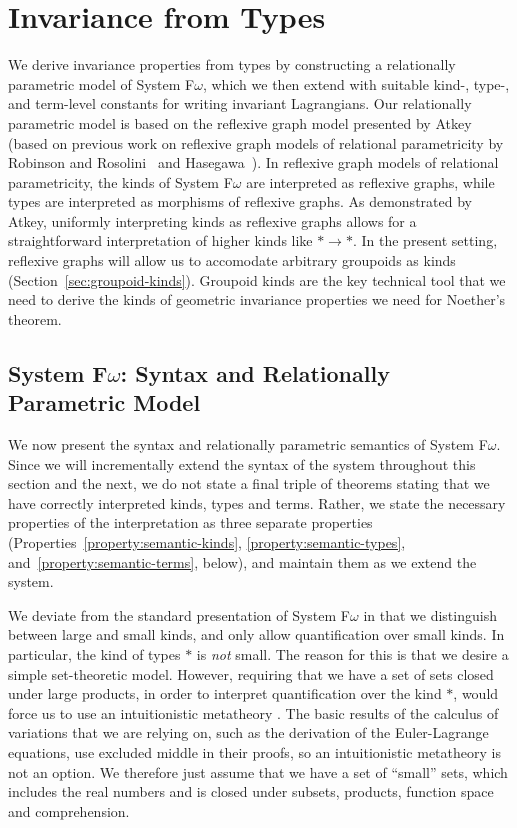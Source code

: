 \documentclass[preprint]{sigplanconf}
\theoremstyle{examplestyle}
\begin{document}
\section{Invariance from Types}
\label{sec:symmetry-from-types}

We derive invariance properties from types by constructing a
relationally parametric model of System F$\omega$, which we then
extend with suitable kind-, type-, and term-level constants for
writing invariant Lagrangians. Our relationally parametric model is
based on the reflexive graph model presented by
Atkey~\cite{atkey12relational} (based on previous work on reflexive
graph models of relational parametricity by Robinson and
Rosolini~\cite{robinson94} and Hasegawa~\cite{hasegawa94}). In
reflexive graph models of relational parametricity, the kinds of
System F$\omega$ are interpreted as reflexive graphs, while types are
interpreted as morphisms of reflexive graphs. As demonstrated by
Atkey, uniformly interpreting kinds as reflexive graphs allows for a
straightforward interpretation of higher kinds like $* \to *$. In the
present setting, reflexive graphs will allow us to accomodate
arbitrary groupoids as kinds
(Section~\ref{sec:groupoid-kinds}). Groupoid kinds are the key
technical tool that we need to derive the kinds of geometric
invariance properties we need for Noether's theorem.

\subsection{System F$\omega$: Syntax and Relationally Parametric Model}
\label{sec:refl-graphs-for-fomega}

We now present the syntax and relationally parametric semantics of
System F$\omega$. Since we will incrementally extend the syntax of the
system throughout this section and the next, we do not state a final
triple of theorems stating that we have correctly interpreted kinds,
types and terms. Rather, we state the necessary properties of the
interpretation as three separate properties
(Properties~\ref{property:semantic-kinds},
\ref{property:semantic-types}, and~\ref{property:semantic-terms},
below), and maintain them as we extend the system.

We deviate from the standard presentation of System F$\omega$ in that
we distinguish between large and small kinds, and only allow
quantification over small kinds. In particular, the kind of types $*$
is \emph{not} small. The reason for this is that we desire a simple
set-theoretic model. However, requiring that we have a set of sets
closed under large products, in order to interpret quantification over
the kind $*$, would force us to use an intuitionistic metatheory
\cite{pitts}. The basic results of the calculus of variations that we
are relying on, such as the derivation of the Euler-Lagrange
equations, use excluded middle in their proofs, so an intuitionistic
metatheory is not an option. We therefore just assume that we have a
set of ``small'' sets, which includes the real numbers and is closed
under subsets, products, function space and comprehension.
\end{document}
